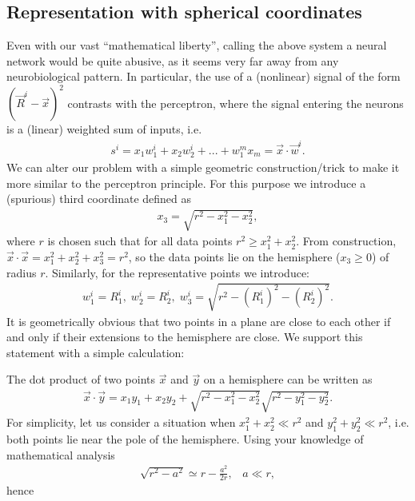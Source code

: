 \documentclass[letterpaper,10pt,english]{jupyterBook}
\begin{document}
\subsection{Representation with spherical coordinates}
\label{\detokenize{docs/unsupervised:representation-with-spherical-coordinates}}
\sphinxAtStartPar
Even with our vast “mathematical liberty”, calling the above system a neural network would be quite abusive, as it seems very far away from any neurobiological pattern. In particular, the use of a (non\sphinxhyphen{}linear) signal of the form \(\left(\vec{R}^i-\vec{x}\right)^2\) contrasts with the perceptron, where the signal entering the neurons is a (linear) weighted sum of inputs, i.e.
\begin{equation*}
\begin{split} s ^ i = x_1 w_1 ^ i + x_2 w_2 ^ i + ... + w_1 ^ m x_m = \vec {x} \cdot \vec {w} ^ i. \end{split}
\end{equation*}
\sphinxAtStartPar
We can alter our problem with a simple geometric construction/trick to make it more similar to the perceptron principle. For this purpose we introduce a (spurious) third coordinate defined as
\begin{equation*}
\begin{split} x_3 = \sqrt {r ^ 2-x_1 ^ 2-x_2 ^ 2}, \end{split}
\end{equation*}
\sphinxAtStartPar
where \( r \) is chosen such that for all data points \( r ^ 2 \ge x_1 ^ 2 + x_2 ^ 2 \).
From construction, \( \vec {x} \cdot \vec {x} = x_1 ^ 2 + x_2 ^ 2 + x_3 ^ 2 = r ^ 2 \), so the data points lie on the hemisphere (\( x_3 \ge 0 \)) of radius \( r \). Similarly, for the representative points we introduce:
\begin{equation*}
\begin{split} w_1 ^ i = R_1 ^ i,  \; w_2 ^ i = R_2 ^ i,  \; 
w_3 ^ i = \sqrt {r ^ 2-(R_1 ^i)^2 -(R_2 ^i)^2}. \end{split}
\end{equation*}
\sphinxAtStartPar
It is geometrically obvious that two points in a plane are close to each other if and only if their extensions to the hemisphere are close. We support this statement with a simple calculation:

\sphinxAtStartPar
The dot product of two points \( \vec {x} \) and \( \vec {y} \) on a hemisphere can be written as
\begin{equation*}
\begin{split} \vec {x} \cdot \vec {y} = x_1 y_1 + x_2 y_2 + \sqrt {r ^ 2-x_1 ^ 2-x_2 ^ 2} \sqrt {r ^ 2-y_1 ^ 2-y_2 ^ 2}. \end{split}
\end{equation*}
\sphinxAtStartPar
For simplicity, let us consider a situation when \( x_1 ^ 2 + x_2 ^ 2 \ll r ^ 2 \) and \( y_1 ^ 2 + y_2 ^ 2 \ll r ^ 2 \), i.e. both points lie near the pole of the hemisphere. Using your knowledge of mathematical analysis
\begin{equation*}
\begin{split} \sqrt{r^2-a^2} \simeq r - \frac{a^2}{2r},  \;\;\;a \ll r, \end{split}
\end{equation*}
\sphinxAtStartPar
hence
\end{document}
